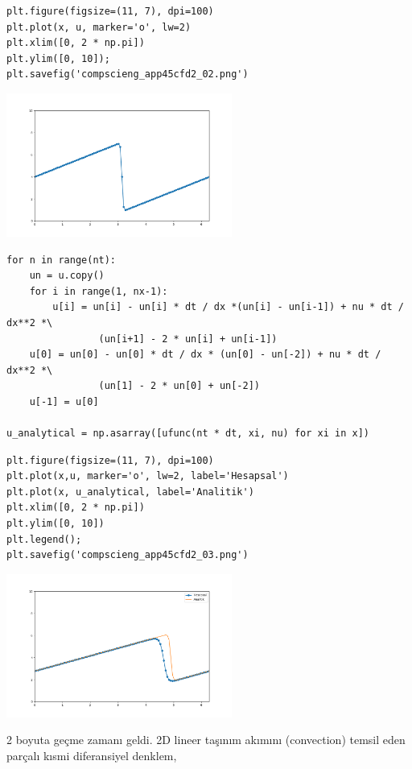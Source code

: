 \documentclass[12pt,fleqn]{article}\usepackage{../../common}
\begin{document}
\begin{verbatim}
plt.figure(figsize=(11, 7), dpi=100)
plt.plot(x, u, marker='o', lw=2)
plt.xlim([0, 2 * np.pi])
plt.ylim([0, 10]);
plt.savefig('compscieng_app45cfd2_02.png')
\end{verbatim}


\includegraphics[width=20em]{compscieng_app45cfd2_02.png}

\begin{verbatim}
for n in range(nt):
    un = u.copy()
    for i in range(1, nx-1):
        u[i] = un[i] - un[i] * dt / dx *(un[i] - un[i-1]) + nu * dt / dx**2 *\
                (un[i+1] - 2 * un[i] + un[i-1])
    u[0] = un[0] - un[0] * dt / dx * (un[0] - un[-2]) + nu * dt / dx**2 *\
                (un[1] - 2 * un[0] + un[-2])
    u[-1] = u[0]
        
u_analytical = np.asarray([ufunc(nt * dt, xi, nu) for xi in x])
\end{verbatim}

\begin{verbatim}
plt.figure(figsize=(11, 7), dpi=100)
plt.plot(x,u, marker='o', lw=2, label='Hesapsal')
plt.plot(x, u_analytical, label='Analitik')
plt.xlim([0, 2 * np.pi])
plt.ylim([0, 10])
plt.legend();
plt.savefig('compscieng_app45cfd2_03.png')
\end{verbatim}


\includegraphics[width=20em]{compscieng_app45cfd2_03.png}

2 boyuta geçme zamanı geldi. 2D lineer taşınım akımını (convection) temsil eden
parçalı kısmi diferansiyel denklem,
\end{document}
